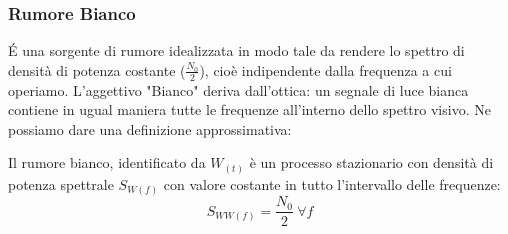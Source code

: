         \subsubsection{Rumore Bianco}
            É una sorgente di rumore idealizzata in modo tale da rendere lo spettro di densità di potenza costante ($\frac{N_0}{2}$), cioè indipendente
            dalla frequenza a cui operiamo. L'aggettivo "Bianco" deriva dall'ottica: un segnale di luce bianca contiene in ugual maniera tutte le frequenze
             all'interno dello spettro visivo. Ne possiamo dare una definizione approssimativa:
             \begin{center}
                Il rumore bianco, identificato da $W_{(t)}$ è un processo stazionario con densità di potenza spettrale $S_{W(f)}$ con valore
                costante in tutto l'intervallo delle frequenze:
                \[
                    S_{WW(f)} = \frac{N_0}{2}\ \forall f  
                \]
             \end{center}
